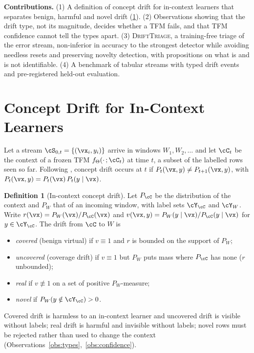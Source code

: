 \documentclass{article}
\theoremstyle{plain}
\theoremstyle{definition}
\newtheorem{definition}{Definition}
\theoremstyle{remark}
\newcommand{\method}{\textsc{DriftTriage}}   %
\begin{document}
\textbf{Contributions.}
(1) A definition of concept drift for in-context learners that separates benign, harmful and novel drift
(\cref{def:icdrift}).
(2) Observations showing that the drift type, not its magnitude, decides whether a TFM fails, and that TFM
confidence cannot tell the types apart.
(3) \method{}, a training-free triage of the error stream, non-inferior in accuracy to the strongest detector while
avoiding needless resets and preserving novelty detection, with propositions on what is and is not identifiable.
(4) A benchmark of tabular streams with typed drift events and pre-registered held-out evaluation.

\section{Concept Drift for In-Context Learners}
\label{sec:def}

Let a stream $\cS_{0,t}=\{(\vx_i,y_i)\}$ arrive in windows $W_1,W_2,\dots$ and let $\cC_t$ be the context of a frozen
TFM $f_{\Theta}(\cdot\,;\cC_t)$ at time $t$, a subset of the labelled rows seen so far. Following
\citet{lu2019learning}, concept drift occurs at $t$ if $P_t(\vx,y)\neq P_{t+1}(\vx,y)$, with
$P_t(\vx,y)=P_t(\vx)\,P_t(y\mid\vx)$.

\begin{definition}[In-context concept drift]\label{def:icdrift}
Let $P_{\cC}$ be the distribution of the context and $P_{W}$ that of an incoming window, with label sets $\cY_{\cC}$
and $\cY_W$. Write $r(\vx)=P_W(\vx)/P_{\cC}(\vx)$ and $v(\vx,y)=P_W(y\mid\vx)/P_{\cC}(y\mid\vx)$ for
$y\in\cY_{\cC}$. The drift from $\cC$ to $W$ is
\begin{itemize}
  \item \emph{covered} (benign virtual) if $v\equiv1$ and $r$ is bounded on the support of $P_W$;
  \item \emph{uncovered} (coverage drift) if $v\equiv1$ but $P_W$ puts mass where $P_{\cC}$ has none ($r$ unbounded);
  \item \emph{real} if $v\not\equiv1$ on a set of positive $P_W$-measure;
  \item \emph{novel} if $P_W(y\notin\cY_{\cC})>0$.
\end{itemize}
\end{definition}

Covered drift is harmless to an in-context learner and uncovered drift is visible without labels; real drift is
harmful and invisible without labels; novel rows must be rejected rather than used to change the context
(Observations~\ref{obs:types},~\ref{obs:confidence}).
\end{document}
